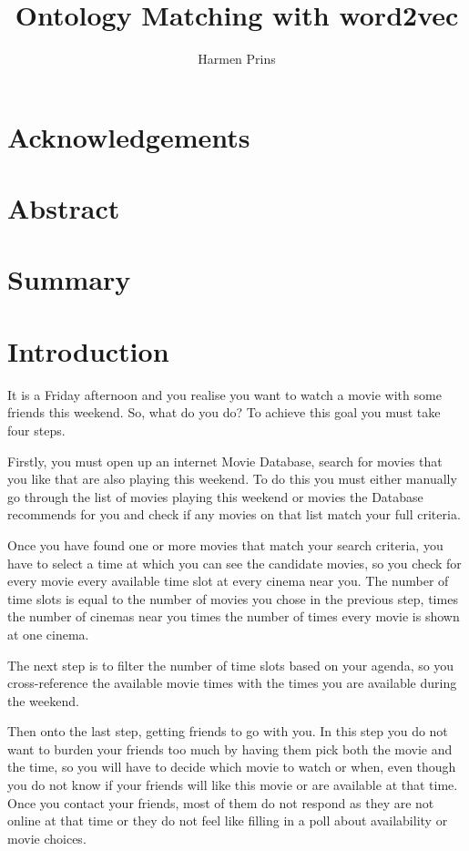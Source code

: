 \documentclass{article}
\title{Ontology Matching with word2vec}
\author{Harmen Prins}
\begin{document}
 \maketitle
 \newpage
 
 \section*{Acknowledgements}
 \section*{Abstract}  
 
 \section*{Summary}
 \tableofcontents
 \newpage
 
 \section{Introduction} \label{intro}
 It is a Friday afternoon and you realise you want to watch a movie with some friends this weekend. So, what do you do? To achieve this goal you must take four steps.
 
 Firstly, you must open up an internet Movie Database, search for movies that you like that are also playing this weekend. To do this you must either manually go through the list of movies playing this weekend or movies the Database recommends for you and check if any movies on that list match your full criteria.
 
 Once you have found one or more movies that match your search criteria, you have to select a time at which you can see the candidate movies, so you check for every movie every available time slot at every cinema near you. The number of time slots is equal to the number of movies you chose in the previous step, times the number of cinemas near you times the number of times every movie is shown at one cinema.
 
 The next step is to filter the number of time slots based on your agenda, so you cross-reference the available movie times with the times you are available during the weekend.
 
 Then onto the last step, getting friends to go with you. In this step you do not want to burden your friends too much by having them pick both the movie and the time, so you will have to decide which movie to watch or when, even though you do not know if your friends will like this movie or are available at that time. Once you contact your friends, most of them do not respond as they are not online at that time or they do not feel like filling in a poll about availability or movie choices.
 
\end{document}
